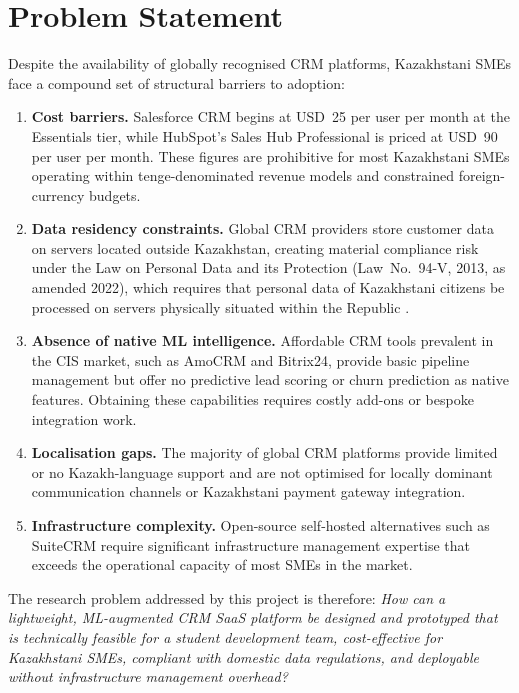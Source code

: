 \section{Problem Statement}

Despite the availability of globally recognised CRM platforms, Kazakhstani
SMEs face a compound set of structural barriers to adoption:

\begin{enumerate}
 
  \item \textbf{Cost barriers.} Salesforce CRM begins at USD~25 per user
  per month at the Essentials tier, while HubSpot's Sales Hub Professional
  is priced at USD~90 per user per month. These figures are prohibitive for
  most Kazakhstani SMEs operating within tenge-denominated revenue models
  and constrained foreign-currency budgets.

  \item \textbf{Data residency constraints.} Global CRM providers store
  customer data on servers located outside Kazakhstan, creating material
  compliance risk under the Law on Personal Data and its Protection
  (Law~No.~94-V, 2013, as amended 2022), which requires that personal data
  of Kazakhstani citizens be processed on servers physically situated
  within the Republic \citep{kazakhstanlaw94v}.

  \item \textbf{Absence of native ML intelligence.} Affordable CRM tools
  prevalent in the CIS market, such as AmoCRM and Bitrix24, provide basic
  pipeline management but offer no predictive lead scoring or churn
  prediction as native features. Obtaining these capabilities requires
  costly add-ons or bespoke integration work.

  \item \textbf{Localisation gaps.} The majority of global CRM platforms
  provide limited or no Kazakh-language support and are not optimised for
  locally dominant communication channels or Kazakhstani payment gateway
  integration.

  \item \textbf{Infrastructure complexity.} Open-source self-hosted
  alternatives such as SuiteCRM require significant infrastructure
  management expertise that exceeds the operational capacity of most SMEs
  in the market.

\end{enumerate}

The research problem addressed by this project is therefore:
\textit{How can a lightweight, ML-augmented CRM SaaS platform be designed
and prototyped that is technically feasible for a student development team,
cost-effective for Kazakhstani SMEs, compliant with domestic data
regulations, and deployable without infrastructure management overhead?}

